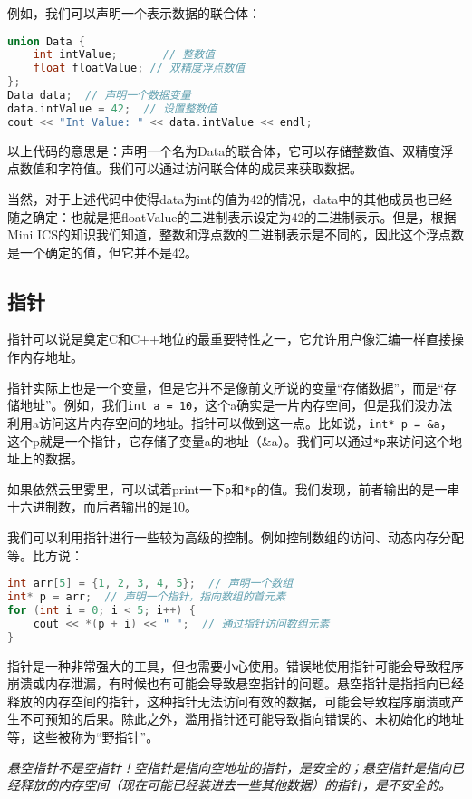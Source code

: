\documentclass[../main.tex]{subfiles}
\begin{document}
例如，我们可以声明一个表示数据的联合体：
\begin{lstlisting}[language=C++]
union Data {
    int intValue;       // 整数值
    float floatValue; // 双精度浮点数值
};
Data data;  // 声明一个数据变量
data.intValue = 42;  // 设置整数值
cout << "Int Value: " << data.intValue << endl;
\end{lstlisting}
以上代码的意思是：声明一个名为Data的联合体，它可以存储整数值、双精度浮点数值和字符值。我们可以通过访问联合体的成员来获取数据。

当然，对于上述代码中使得data为int的值为42的情况，data中的其他成员也已经随之确定：也就是把floatValue的二进制表示设定为42的二进制表示。但是，根据Mini ICS的知识我们知道，整数和浮点数的二进制表示是不同的，因此这个浮点数是一个确定的值，但它并不是42。

\subsection{指针}

指针可以说是奠定C和C++地位的最重要特性之一，它允许用户像汇编一样直接操作内存地址。

指针实际上也是一个变量，但是它并不是像前文所说的变量“存储数据”，而是“存储地址”。例如，我们\texttt{int a = 10}，这个a确实是一片内存空间，但是我们没办法利用a访问这片内存空间的地址。指针可以做到这一点。比如说，\texttt{int* p = \&a}，这个p就是一个指针，它存储了变量a的地址（\&a）。我们可以通过\texttt{*p}来访问这个地址上的数据。

如果依然云里雾里，可以试着print一下\texttt{p}和\texttt{*p}的值。我们发现，前者输出的是一串十六进制数，而后者输出的是10。

我们可以利用指针进行一些较为高级的控制。例如控制数组的访问、动态内存分配等。比方说：

\begin{lstlisting}[language=C++]
int arr[5] = {1, 2, 3, 4, 5};  // 声明一个数组
int* p = arr;  // 声明一个指针，指向数组的首元素
for (int i = 0; i < 5; i++) {
    cout << *(p + i) << " ";  // 通过指针访问数组元素
}
\end{lstlisting}

指针是一种非常强大的工具，但也需要小心使用。错误地使用指针可能会导致程序崩溃或内存泄漏，有时候也有可能会导致悬空指针的问题。悬空指针是指指向已经释放的内存空间的指针，这种指针无法访问有效的数据，可能会导致程序崩溃或产生不可预知的后果。除此之外，滥用指针还可能导致指向错误的、未初始化的地址等，这些被称为“野指针”。

\emph{
  悬空指针不是空指针！空指针是指向空地址的指针，是安全的；悬空指针是指向已经释放的内存空间（现在可能已经装进去一些其他数据）的指针，是不安全的。
}
\end{document}
